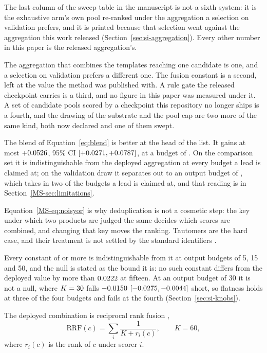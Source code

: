 \documentclass[journal=jcisd8,manuscript=suppinfo,layout=onecolumn]{achemso}
\begin{document}
The last column of the sweep table in the manuscript is not a sixth system: it is the
exhaustive arm's own pool re-ranked under the aggregation a selection on validation prefers, and
it is printed because that selection went against the aggregation this work released
(Section~\ref{sec:si-aggregation}). Every other number in this paper is the released
aggregation's.

The aggregation that combines the
templates reaching one candidate is one, and a selection on validation prefers a different one.
The fusion constant is a second, left at the value the method was published with. A rule gate the
released checkpoint carries is a third, and no figure in this paper was measured under it. A set
of candidate pools scored by a checkpoint this repository no longer ships is a fourth, and the
drawing of the substrate and the pool cap are two more of the same kind, both now declared and
one of them swept.

The blend of Equation~\ref{eq:blend} is better at the head of the list.
It gains at most $+0.0526$, 95\% CI
$[+0.0271, +0.0787]$, at a budget of
\numAggCmpHybridMaxkWord{}. On the comparison set it is
indistinguishable from the deployed aggregation at every budget a lead is claimed at; on the
validation draw it separates out to an output budget of \numAggValHybridSepto{}, which takes in
two of the budgets a lead is claimed at, and that reading is in Section~\ref{MS-sec:limitations}.

Equation~\ref{MS-eq:noisyor}
is why deduplication is not a cosmetic step: the key under which two products are judged the same
decides which scores are combined, and changing that key moves the ranking. Tautomers are the
hard case, and their treatment is not settled by the standard identifiers \citep{Dhaked_2020}.

Every constant of
\numFusionkFlatfrom{} or more is indistinguishable from it at output budgets of 5, 15 and 50, and
the null
is stated as the bound it is: no such constant differs from the deployed value by more than
$0.0222$ at fifteen. At an output budget of 30 it is not a null, where
$K=30$ falls $-0.0150$
$[-0.0275, -0.0044]$ short, so flatness holds at three of the four budgets
and fails at the fourth (Section~\ref{sec:si-knobs}).

The
deployed combination is reciprocal rank fusion \citep{cormack2009},
\begin{equation}
\mathrm{RRF}(c) = \sum_{i} \frac{1}{K + r_i(c)}, \qquad K = 60,
\end{equation}
where $r_i(c)$ is the rank of $c$ under scorer $i$.
\end{document}
